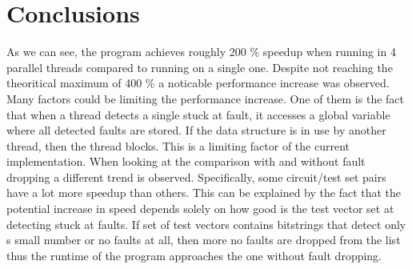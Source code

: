 \documentclass[a4paper,12pt]{article}
\begin{document}
\clearpage
\section*{Conclusions}
As we can see, the program achieves roughly 200 \% speedup when running in 4 parallel threads compared to running on a single one. Despite not reaching the theoritical maximum of 400 \% a noticable performance increase was observed. Many factors could be limiting the performance increase. One of them is the fact that when a thread detects a single stuck at fault, it accesses a global variable where all detected faults are stored. If the data structure is in use by another thread, then the thread blocks. This is a limiting factor of the current implementation. When looking at the comparison with and without fault dropping a different trend is observed. Specifically, some circuit/test set pairs have a lot more speedup than others. This can be explained by the fact that the potential increase in speed depends solely on how good is the test vector set at detecting stuck at faults. If set of test vectors contains bitstrings that detect only s small number or no faults at all, then more no faults are dropped from the list thus the runtime of the program approaches the one without fault dropping.
\end{document}
